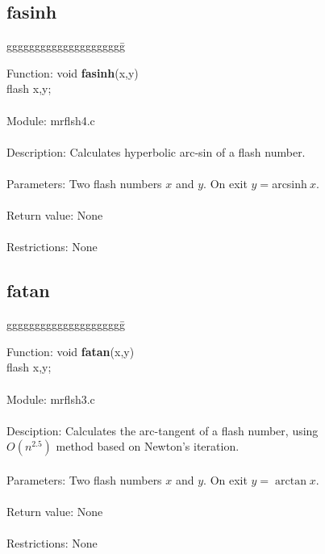 \subsection{fasinh}

\begin{tabbing}
ggggggggggggggggggggg\= \kill


      Function:      \>void {\bf fasinh}(x,y) \\
                     \>flash x,y; \\
      \ \\
      Module:        \>mrflsh4.c \\
      \ \\
      Description:   \>Calculates hyperbolic arc-sin of a flash number. \\
      \ \\
      Parameters:    \>Two flash numbers $x$ and $y$. On exit $y=$arcsinh$\ x$. \\
      \ \\
      Return value:  \>None \\
      \ \\
      Restrictions:  \>None \\

\end{tabbing}

\subsection{fatan}

\begin{tabbing}
ggggggggggggggggggggg\= \kill

      Function:      \>void {\bf fatan}(x,y) \\
                     \>flash x,y; \\
      \ \\
      Module:        \>mrflsh3.c \\
      \ \\
      Desciption:    \>Calculates the arc-tangent of a flash number, using \\
                     \>$O(n^{2.5})$ method based on Newton's iteration. \\
      \ \\
      Parameters:    \>Two flash numbers $x$ and $y$. On exit $y=\arctan x$. \\
      \ \\
      Return value:  \>None \\
      \ \\
      Restrictions:  \>None \\

\end{tabbing}
\pagebreak
